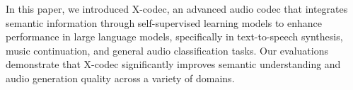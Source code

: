 In this paper, we introduced X-codec, an advanced audio codec that integrates semantic information through self-supervised learning models to enhance performance in large language models, specifically in text-to-speech synthesis, music continuation, and general audio classification tasks. Our evaluations demonstrate that X-codec significantly improves semantic understanding and audio generation quality across a variety of domains.  

